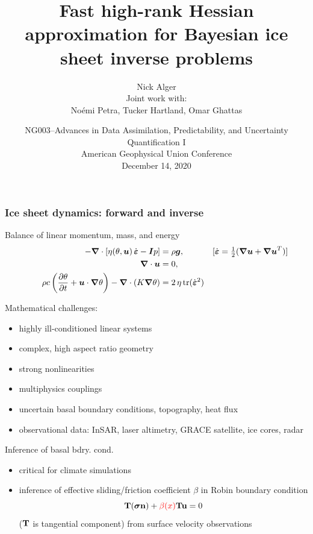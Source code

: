 \documentclass[10pt,final,xcolor=dvipsnames]{beamer}
\title[]{Fast high-rank Hessian approximation for Bayesian ice sheet
  inverse problems}
\author[Nick Alger]{{Nick Alger}\inst{1}\\[2ex]
  {\small \textcolor{themec}{Joint work with:}}
  \\
  {\small No\'{e}mi Petra},\inst{2}
  {\small Tucker Hartland},\inst{2}
  {\small Omar Ghattas\inst{1}}}
\institute[UT]{%
  \inst{1}{Oden Institute\\
    The University of Texas at Austin}\\\smallskip
  \inst{2}{Applied Mathematics, School of Natural Sciences\\
    University of California, Merced}\\\smallskip
}
\date[December 14, 2020]{%
  \footnotesize
  NG003--Advances in Data Assimilation, Predictability, and Uncertainty Quantification I\\
  American Geophysical Union Conference\\
  December 14, 2020}
\newcommand{\gbf}[1]{\boldsymbol{#1}}
\newcommand{\bs}[1]{\ensuremath{\boldsymbol{#1}}}
\newcommand{\edot}{\dot{\gbf{\varepsilon}}}
\newcommand{\tcr}[1]{\ensuremath{\textcolor{red}{{#1}}}}
\begin{document}
\begin{frame}[plain]
  \titlepage
\end{frame}
\begin{frame}
\frametitle{Ice sheet dynamics: forward and inverse}

\begin{block}{Balance of linear momentum, mass, and energy}
  \[
  \begin{aligned}
    - \gbf{\nabla} \cdot \left[ \eta(\theta,\gbf{u}) \, \edot
      -\gbf{I}p \right] &= \rho \gbf{g},
    &[\edot = \tfrac 12  (\gbf{\nabla u} + \gbf{\nabla  u}^T)]
    \hspace{-2em}
    \\
    \gbf{\nabla} \cdot \gbf{u} &= 0,
    \vspace{-2em} \\
    \rho c \left(\frac{\partial \theta}{\partial t} + \gbf{u} \cdot \gbf{\nabla}
    \theta\right)  - \gbf{\nabla} \cdot (K \gbf{\nabla} \theta)
    &= 2 \, \eta \, \mathrm{tr}(\edot^2)
  \end{aligned}
  \]
\end{block}
\vspace{0.2cm}
\begin{minipage}{.49\columnwidth}
  \alert{Mathematical challenges:}
  \begin{itemize}
    \small
  \item highly ill-conditioned linear systems
  \item complex, high aspect ratio geometry
  \item strong nonlinearities
  \item multiphysics couplings
  \item uncertain \alert{basal boundary conditions}, topography,
    heat flux
  \item observational data: InSAR, laser altimetry, GRACE
    satellite, ice cores, radar
  \end{itemize}
\end{minipage}
\begin{minipage}{.48\columnwidth}
  \alert{Inference of basal bdry. cond.}
  \begin{itemize}
    \small
  \item critical for climate simulations %
  \item inference of effective sliding/friction coefficient $\beta$ in
    Robin boundary condition
    \begin{equation*}
      {\bf T}(\bs \sigma {\bf n}) + \tcr{\beta (x)}{\bf T}{\bf u} = 0
    \end{equation*}
    ($\bf T$ is tangential component)  from
    surface velocity observations
  \end{itemize}
\end{minipage}
\end{frame}
\end{document}
